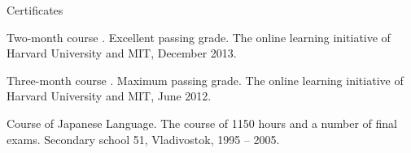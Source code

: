\documentclass{template}
\begin{document}
\begin{rSection}{Certificates}
\begin{rItemize}

\item Two-month course \href{http://www.vova-ivanov.info/6.00.1x-Certificate.pdf}
      {}. Excellent passing grade. \newline
      The online learning initiative of Harvard University and MIT, December 2013.
\item Three-month course \href{http://www.vova-ivanov.info/6.002x-Certificate.pdf}
      {}. Maximum passing grade. \newline
      The online learning initiative of Harvard University and MIT, June 2012.
\item Course of Japanese Language. The course of 1150 hours and a number of final exams. \newline
      Secondary school 51, Vladivostok, 1995 -- 2005.

\end{rItemize}
\end{rSection}

\end{document}
